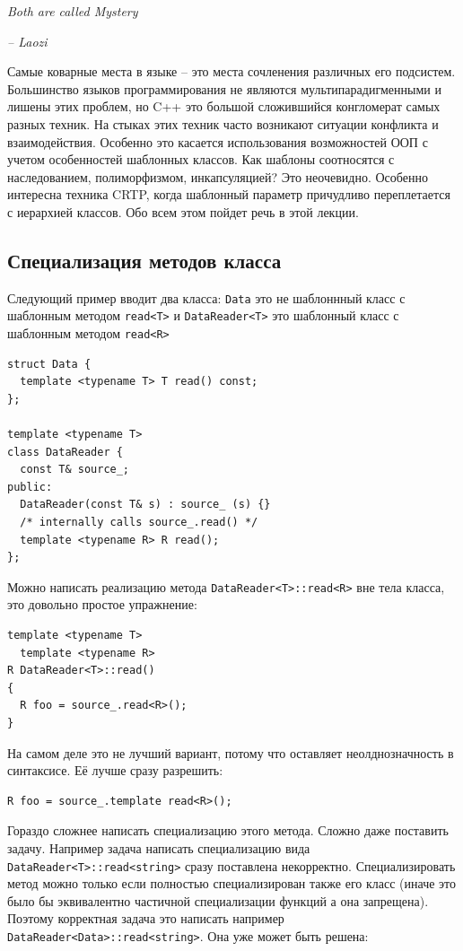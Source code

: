 \documentclass[a4paper,12pt,oneside]{book}
\begin{document}
\hfill\textit{Both are called Mystery}{\vspace{0.5em}}

\hfill\textit{-- Laozi}

Самые коварные места в языке -- это места сочленения различных его подсистем. Большинство языков программирования не являются мультипарадигменными и лишены этих проблем, но C++ это большой сложившийся конгломерат самых разных техник. На стыках этих техник часто возникают ситуации конфликта и взаимодействия. Особенно это касается использования возможностей ООП с учетом особенностей шаблонных классов. Как шаблоны соотносятся с наследованием, полиморфизмом, инкапсуляцией? Это неочевидно. Особенно интересна техника CRTP, когда шаблонный параметр причудливо переплетается с иерархией классов. Обо всем этом пойдет речь в этой лекции.

\subsection{Специализация методов класса}\label{MemberSpec}

Следующий пример вводит два класса: \lstinline!Data! это не шаблоннный класс с шаблонным методом \lstinline!read<T>! и \lstinline!DataReader<T>! это шаблонный класс с шаблонным методом \lstinline!read<R>!

\begin{lstlisting}
struct Data {
  template <typename T> T read() const;
};

template <typename T>  
class DataReader {
  const T& source_;
public:
  DataReader(const T& s) : source_ (s) {}
  /* internally calls source_.read() */
  template <typename R> R read();
};
\end{lstlisting}

Можно написать реализацию метода \lstinline!DataReader<T>::read<R>! вне тела класса, это довольно простое упражнение:

\begin{lstlisting}
template <typename T>
  template <typename R> 
R DataReader<T>::read()
{
  R foo = source_.read<R>();
}
\end{lstlisting}

На самом деле это не лучший вариант, потому что оставляет неолднозначность в синтаксисе. Её лучше сразу разрешить:

\begin{lstlisting}
R foo = source_.template read<R>();
\end{lstlisting}

Гораздо сложнее написать специализацию этого метода. Сложно даже поставить задачу. Например задача написать специализацию вида \lstinline!DataReader<T>::read<string>! сразу поставлена некорректно. Специализировать метод можно только если полностью специализирован также его класс (иначе это было бы эквивалентно частичной специализации функций а она запрещена). Поэтому корректная задача это написать например \lstinline!DataReader<Data>::read<string>!. Она уже может быть решена:
\end{document}
